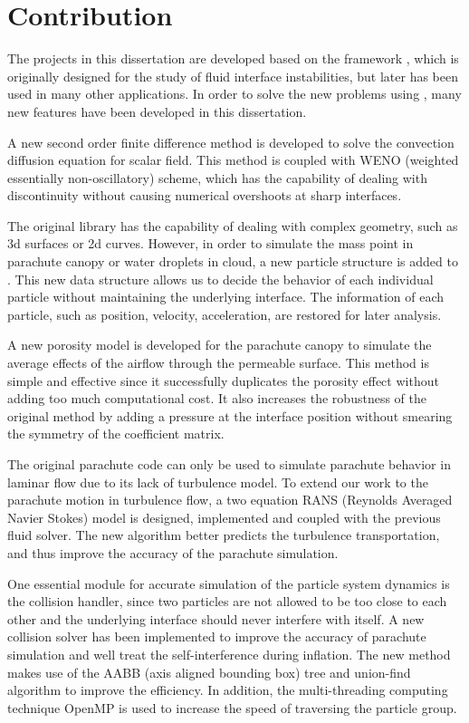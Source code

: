 \section{Contribution}
The projects in this dissertation are developed based on the \FronTierp 
framework \cite{}, which is  
originally designed for the study of fluid interface instabilities, but later has been 
used in many other applications. In order to solve the new problems using \FronTierp, many 
new features have been developed in this dissertation.   

A new second order finite difference method is developed to solve the convection 
diffusion equation for scalar field. This method is coupled with 
WENO (weighted essentially non-oscillatory) scheme, which has the capability of 
dealing with discontinuity without causing numerical overshoots at sharp interfaces.

The original \FronTierp library has the capability of dealing with complex geometry, such 
as 3d surfaces or 2d curves. However, in order to simulate the mass point 
in parachute canopy or water droplets in cloud, a new particle structure is added to 
\FronTierp. This new data structure allows us to decide the behavior of each individual particle without maintaining the underlying interface. The information of each particle, such as position, velocity, acceleration, are restored for later analysis.

A new porosity model is developed for the parachute canopy to simulate the average effects 
of the airflow through the permeable surface. This method is simple and effective since it 
successfully duplicates the porosity effect without adding too much computational cost. It 
also increases the robustness of the original method by adding a pressure at the interface 
position without smearing the symmetry of the coefficient matrix.

The original parachute code can only be used to simulate parachute behavior in laminar flow due  to its lack of turbulence model. To extend our work to the parachute motion in turbulence flow, a two equation RANS (Reynolds Averaged Navier Stokes) model is designed, implemented and coupled with the previous fluid solver. The new algorithm better predicts the turbulence transportation, and thus improve the accuracy of the parachute simulation.

One essential module for accurate simulation of the particle system dynamics is the collision handler, since two particles are not allowed to be too close to each other and the underlying interface should never interfere with itself. A new collision solver has been implemented to improve the accuracy of parachute simulation and well treat the self-interference during inflation. The new method makes use of the AABB (axis aligned bounding box) tree and union-find algorithm to improve the efficiency. In addition, the multi-threading computing technique OpenMP is used to increase the speed of traversing the particle group.       

